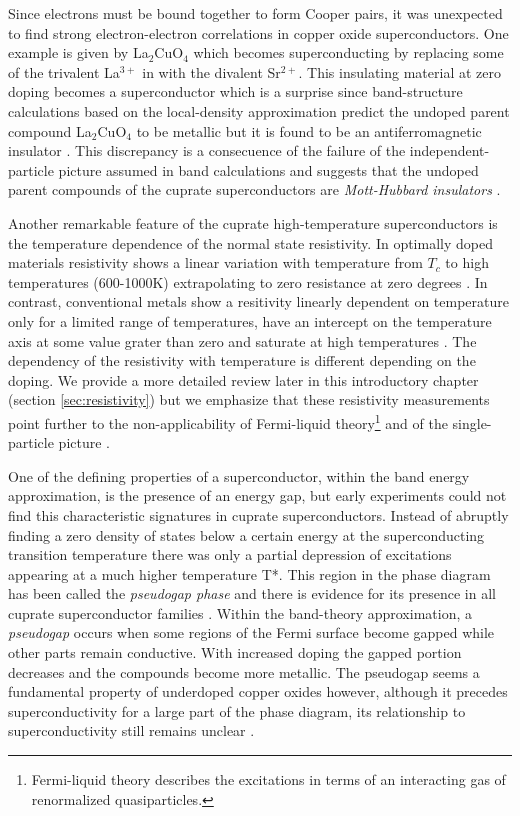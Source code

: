 Since electrons must be bound together to form Cooper pairs, it was unexpected to find strong electron-electron correlations in copper oxide superconductors. 
One example is given by La$_2$CuO$_4$ which becomes superconducting by replacing some of the trivalent La$^{3+}$ in with the divalent Sr$^{2+}$. 
This insulating material at zero doping becomes a superconductor which is a surprise since band-structure calculations based on the local-density approximation predict the undoped parent compound La$_2$CuO$_4$ to be metallic but it is found to be an antiferromagnetic insulator \cite{Timusk1999}.
This discrepancy is a consecuence of the failure of the independent-particle picture assumed in band calculations and suggests that the undoped parent compounds of the cuprate superconductors are \textit{Mott-Hubbard insulators} \cite{Mott1949}.

Another remarkable feature of the cuprate high-temperature superconductors is the temperature dependence of the normal state resistivity.
In optimally doped materials resistivity shows a linear variation with temperature from $T_c$ to high temperatures (600-1000K) extrapolating to zero resistance at zero degrees \cite{Gurvitch1987}.
In contrast, conventional metals show a resitivity linearly dependent on temperature only for a limited range of temperatures, have an intercept on the temperature axis at some value grater than zero and saturate at high temperatures \cite{Timusk1999}.
The dependency of the resistivity with temperature is different depending on the doping. 
We provide a more detailed review later in this introductory chapter (section \ref{sec:resistivity}) but we emphasize that these resistivity measurements point further to the non-applicability of Fermi-liquid theory\footnote{Fermi-liquid theory describes the excitations in terms of an interacting gas of renormalized quasiparticles.} and of the single-particle picture \cite{Orenstein2000}.

One of the defining properties of a superconductor, within the band energy approximation, is the presence of an energy gap, but early experiments could not find this characteristic signatures in cuprate superconductors.
Instead of abruptly finding a zero density of states below a certain energy at the superconducting transition temperature there was only a partial depression of excitations appearing at a much higher temperature T*.
This region in the phase diagram has been called the \textit{pseudogap phase} and there is evidence for its presence in all cuprate superconductor families \cite{Timusk1999,Muller2007}.
Within the band-theory approximation, a \textit{pseudogap} occurs when some regions of the Fermi surface become gapped while other parts remain conductive. 
With increased doping the gapped portion decreases and the compounds become more metallic. 
The pseudogap seems a fundamental property of underdoped copper oxides however, although it precedes superconductivity for a large part of the phase diagram, its relationship to superconductivity still remains unclear \cite{Basov2005}.

